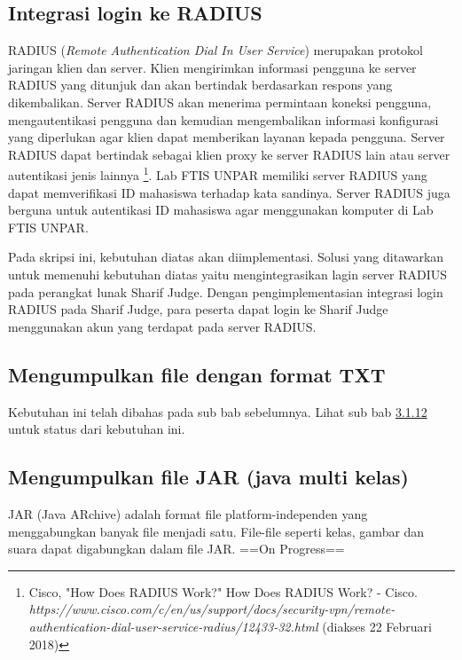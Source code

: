 \subsection{Integrasi login ke RADIUS}
RADIUS (\textit{Remote Authentication Dial In User Service}) merupakan protokol jaringan klien dan server. Klien mengirimkan informasi pengguna ke server RADIUS yang ditunjuk dan akan bertindak berdasarkan respons yang dikembalikan. Server RADIUS akan menerima permintaan koneksi pengguna, mengautentikasi pengguna dan kemudian mengembalikan informasi konfigurasi yang diperlukan agar klien dapat memberikan layanan kepada pengguna. Server RADIUS dapat bertindak sebagai klien proxy ke server RADIUS lain atau server autentikasi jenis lainnya \footnote{Cisco, "How Does RADIUS Work?" How Does RADIUS Work? - Cisco. \textit{https://www.cisco.com/c/en/us/support/docs/security-vpn/remote-authentication-dial-user-service-radius/12433-32.html} (diakses 22 Februari 2018)}. %
Lab FTIS UNPAR memiliki server RADIUS yang dapat memverifikasi ID mahasiswa terhadap kata sandinya. Server RADIUS juga berguna untuk autentikasi ID mahasiswa agar menggunakan komputer di Lab FTIS UNPAR.

Pada skripsi ini, kebutuhan diatas akan diimplementasi. Solusi yang ditawarkan untuk memenuhi kebutuhan diatas yaitu mengintegrasikan lagin server RADIUS pada perangkat lunak Sharif Judge. Dengan pengimplementasian integrasi login RADIUS pada Sharif Judge, para peserta dapat login ke Sharif Judge menggunakan akun yang terdapat pada server RADIUS. 

\subsection{Mengumpulkan file dengan format TXT}
Kebutuhan ini telah dibahas pada sub bab sebelumnya. Lihat sub bab \hyperref[subsec:filetxt]{3.1.12} untuk status dari kebutuhan ini.

\subsection{Mengumpulkan file JAR (java multi kelas)}
JAR (Java ARchive) adalah format file platform-independen yang menggabungkan banyak file menjadi satu. File-file seperti kelas, gambar dan suara dapat digabungkan dalam file JAR. ==On Progress==

